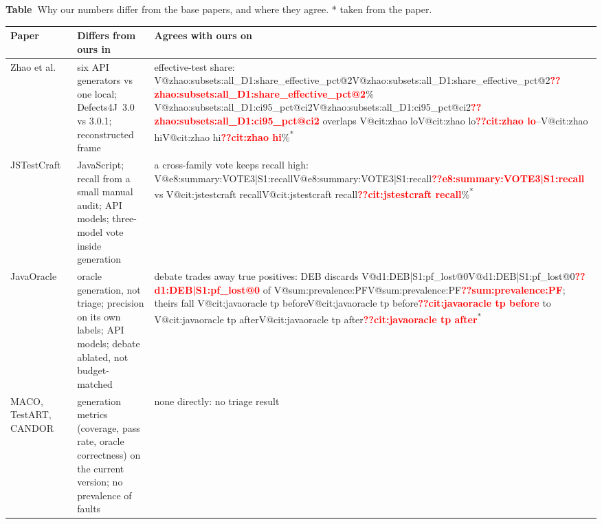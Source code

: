 \documentclass[pdflatex,iicol,sn-mathphys-num]{sn-jnl}
\makeatletter
\newcommand{\V}[1]{\ifcsname V@#1\endcsname\csname V@#1\endcsname\else\textbf{\textcolor{red}{??#1}}\fi}
\newcommand{\cited}{\textsuperscript{*}}
\makeatother
\begin{document}
\begin{appendices}
\par\medskip\noindent\begin{minipage}{\columnwidth}{\footnotesize{}\label{tab:gap}\textbf{Table~\thetable}\enspace Why our numbers differ from the base papers, and where they agree. * taken from the paper.\par}\smallskip
{\noindent\scriptsize\setlength{\tabcolsep}{2.5pt}
\begin{tabularx}{\columnwidth}{@{}>{\raggedright\arraybackslash}p{1.35cm} Y Y@{}}
\toprule
Paper & Differs from ours in & Agrees with ours on \\
\midrule
Zhao et al.~\cite{zhao2026misguidance} & six API generators vs one local; Defects4J~3.0 vs 3.0.1; reconstructed frame & effective-test share: \V{zhao:subsets:all_D1:share_effective_pct@2}\% \V{zhao:subsets:all_D1:ci95_pct@ci2} overlaps \V{cit:zhao lo}--\V{cit:zhao hi}\%\cited \\
JSTestCraft~\cite{liu2026jstestcraft} & JavaScript; recall from a small manual audit; API models; three-model vote inside generation & a cross-family vote keeps recall high: \V{e8:summary:VOTE3|S1:recall} vs \V{cit:jstestcraft recall}\%\cited \\
JavaOracle~\cite{fu2026javaoracle} & oracle generation, not triage; precision on its own labels; API models; debate ablated, not budget-matched & debate trades away true positives: DEB discards \V{d1:DEB|S1:pf_lost@0} of \V{sum:prevalence:PF}; theirs fall \V{cit:javaoracle tp before} to \V{cit:javaoracle tp after}\cited \\
MACO, TestART, CANDOR~\cite{xie2026maco,gu2026testart,xu2026candor} & generation metrics (coverage, pass rate, oracle correctness) on the current version; no prevalence of faults & none directly: no triage result \\
\bottomrule
\end{tabularx}
\par}\end{minipage}\par\medskip



\end{appendices}
\end{document}
